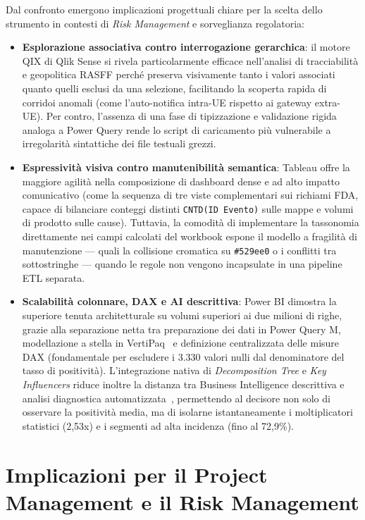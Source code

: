 Dal confronto emergono implicazioni progettuali chiare per la scelta dello strumento in contesti di \textit{Risk Management} e sorveglianza regolatoria:
\begin{itemize}
    \item \textbf{Esplorazione associativa contro interrogazione gerarchica}: il motore QIX di Qlik Sense si rivela particolarmente efficace nell'analisi di tracciabilità e geopolitica RASFF perché preserva visivamente tanto i valori associati quanto quelli esclusi da una selezione, facilitando la scoperta rapida di corridoi anomali (come l'auto-notifica intra-UE rispetto ai gateway extra-UE). Per contro, l'assenza di una fase di tipizzazione e validazione rigida analoga a Power Query rende lo script di caricamento più vulnerabile a irregolarità sintattiche dei file testuali grezzi.
    \item \textbf{Espressività visiva contro manutenibilità semantica}: Tableau offre la maggiore agilità nella composizione di dashboard dense e ad alto impatto comunicativo (come la sequenza di tre viste complementari sui richiami FDA, capace di bilanciare conteggi distinti \texttt{CNTD(ID Evento)} sulle mappe e volumi di prodotto sulle cause). Tuttavia, la comodità di implementare la tassonomia direttamente nei campi calcolati del workbook espone il modello a fragilità di manutenzione --- quali la collisione cromatica su \texttt{\#529ee0} o i conflitti tra sottostringhe --- quando le regole non vengono incapsulate in una pipeline ETL separata.
    \item \textbf{Scalabilità colonnare, DAX e AI descrittiva}: Power BI dimostra la superiore tenuta architetturale su volumi superiori ai due milioni di righe, grazie alla separazione netta tra preparazione dei dati in Power Query M, modellazione a stella in VertiPaq~\citep{kimball2013} e definizione centralizzata delle misure DAX (fondamentale per escludere i 3.330 valori nulli dal denominatore del tasso di positività). L'integrazione nativa di \textit{Decomposition Tree} e \textit{Key Influencers} riduce inoltre la distanza tra Business Intelligence descrittiva e analisi diagnostica automatizzata~\citep{sharda2020}, permettendo al decisore non solo di osservare la positività media, ma di isolarne istantaneamente i moltiplicatori statistici (2,53x) e i segmenti ad alta incidenza (fino al 72,9\%).
\end{itemize}

\section{Implicazioni per il Project Management e il Risk Management}
\label{sec:disc_implications}

